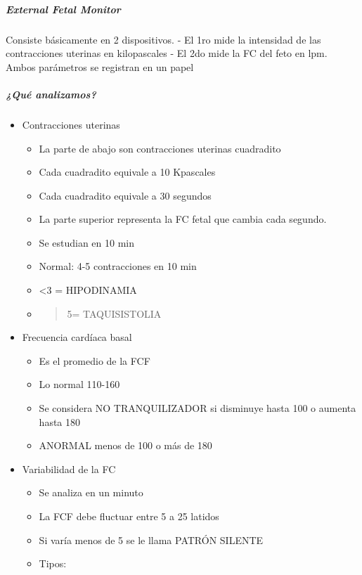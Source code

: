 \documentclass[
]{article}
\providecommand{\tightlist}{%
  \setlength{\itemsep}{0pt}\setlength{\parskip}{0pt}}
\begin{document}
\hypertarget{external-fetal-monitor}{%
\subparagraph{External Fetal Monitor}\label{external-fetal-monitor}}

Consiste básicamente en 2 dispositivos. - El 1ro mide la intensidad de
las contracciones uterinas en kilopascales - El 2do mide la FC del feto
en lpm. Ambos parámetros se registran en un papel

\hypertarget{quuxe9-analizamos}{%
\subparagraph{¿Qué analizamos?}\label{quuxe9-analizamos}}

\begin{itemize}
\tightlist
\item
  Contracciones uterinas

  \begin{itemize}
  \item
    La parte de abajo son contracciones uterinas cuadradito
  \item
    Cada cuadradito equivale a 10 Kpascales
  \item
    Cada cuadradito equivale a 30 segundos
  \item
    La parte superior representa la FC fetal que cambia cada segundo.
  \item
    Se estudian en 10 min
  \item
    Normal: 4-5 contracciones en 10 min
  \item
    \textless3 = HIPODINAMIA
  \item
    \begin{quote}
    5= TAQUISISTOLIA
    \end{quote}
  \end{itemize}
\item
  Frecuencia cardíaca basal

  \begin{itemize}
  \tightlist
  \item
    Es el promedio de la FCF
  \item
    Lo normal 110-160
  \item
    Se considera NO TRANQUILIZADOR si disminuye hasta 100 o aumenta
    hasta 180
  \item
    ANORMAL menos de 100 o más de 180
  \end{itemize}
\item
  Variabilidad de la FC

  \begin{itemize}
  \tightlist
  \item
    Se analiza en un minuto
  \item
    La FCF debe fluctuar entre 5 a 25 latidos
  \item
    Si varía menos de 5 se le llama PATRÓN SILENTE
  \item
    Tipos:


\end{itemize}
\end{itemize}
\end{document}
